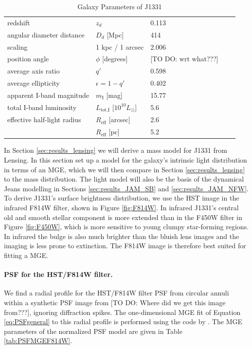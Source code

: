 \begin{table}
\centering
\caption{Galaxy Parameters of J1331}
\begin{tabular}{lllrl}
\hline
redshift                  & $z_d$ & 0.113 & \citep{SWELLSIII}\\
angular diameter distance & $D_d$ [Mpc] & 414 & \\
scaling                   & 1 kpc / 1 arcsec & 2.006 & \\
position angle            & $\phi$ [degrees] & [TO DO: wrt what???]\\
average axis ratio & $q'$ & 0.598\\
average ellipticity & $\epsilon = 1 - q'$ & 0.402 & \\
apparent I-band magnitude & $m_\text{I}$ [mag] & 15.77 & \\
total I-band luminosity & $L_\text{tot,I}$ [$10^{10} L_\odot$] & 5.6 & \\
effective half-light radius & $R_\text{eff}$ [arcsec] & 2.6 & \\
& $R_\text{eff}$ [pc]& 5.2 & \\
\hline
\end{tabular}
\label{tab:galaxyparameters}
\end{table}


In Section \ref{sec:results_lensing} we will derive a mass model for J1331 from Lensing. In this section set up a model for the galaxy's intrinsic light distribution in terms of an MGE, which we will then compare in Section \ref{sec:results_lensing} to the mass distribution. The light model will also be the basis of the dynamical Jeans modelling in Sections \ref{sec:results_JAM_SB} and \ref{sec:results_JAM_NFW}.
\\To derive J1331's surface brightness distribution, we use the HST image in the infrared F814W filter, shown in Figure \ref{fig:F814W}. In infrared J1331's central old and smooth stellar component is more extended than in the F450W filter in Figure \ref{fig:F450W}, which is more sensitive to young clumpy star-forming regions. In infrared the bulge is also much brighter than the bluish lens images and the imaging is less prone to extinction. The F814W image is therefore best suited for fitting a MGE. 

\paragraph{PSF for the HST/F814W filter.} We find a radial profile for the HST/F814W filter PSF from circular annuli within a synthetic PSF image from [TO DO: Where did we get this image from???], ignoring diffraction spikes. The one-dimensional MGE fit of Equation \ref{eq:PSFgeneral} to this radial profile is performed using the code by \citet{Cap02}. The MGE parameters of the normalized PSF model are given in Table \ref{tab:PSFMGEF814W}.

